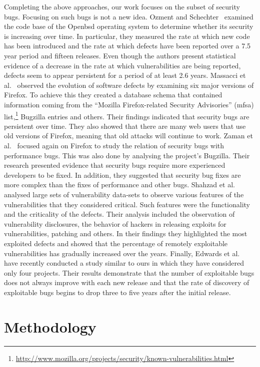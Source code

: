 \documentclass{sig-alternate}
\begin{document}
Completing the above approaches, our work focuses on the subset of security bugs.
Focusing on such bugs is not a new idea.
Ozment and Schechter~\cite{OS06} examined the code base of the Open{\sc bsd}
operating system to determine whether its security is increasing
over time. In particular, they measured the rate at which new code
has been introduced and the rate at which defects have been reported over
a 7.5 year period and fifteen releases.
Even though the authors present statistical evidence
of a decrease in the rate at which vulnerabilities are being reported,
defects seem to appear persistent for a period of at least 2.6 years.
Massacci et al.~\cite{MNN11} observed
the evolution of software defects by examining six major versions of Firefox.
To achieve this they created a database schema that contained information
coming from the ``Mozilla Firefox-related Security Advisories'' ({\sc mfsa})
list,\footnote{\url{http://www.mozilla.org/projects/security/known-vulnerabilities.html}}
Bugzilla entries and others. Their findings indicated that security bugs are
persistent over time. They also showed that there are many web users that use
old versions of Firefox, meaning that old attacks will continue to work.
Zaman et al.~\cite{ZAH11} focused again on Firefox to study the relation of
security bugs with performance bugs. This was also done by analysing the project's
Bugzilla. Their research presented evidence that security bugs require more experienced developers
to be fixed. In addition, they suggested that security bug fixes are more complex than the
fixes of performance and other bugs.
Shahzad et al.~\cite{SSL12} analysed large sets of vulnerability data-sets to observe
various features of the vulnerabilities that they considered critical. Such features
were the functionality and the criticality of the defects. Their analysis
included the observation of vulnerability disclosures, the behavior of
hackers in releasing exploits for vulnerabilities, patching and others. In
their findings they highlighted the most exploited defects and showed that
the percentage of remotely exploitable vulnerabilities has gradually increased
over the years. Finally, Edwards et al.~\cite{EC12} have recently conducted
a study similar  to ours in which they have considered only four projects.
Their results demonstrate that the number of exploitable bugs does not
always improve with each new release and that the rate of discovery of
exploitable bugs begins to drop three to five years after the
initial release.

\section{Methodology}
\label{sec:meth}
\end{document}
